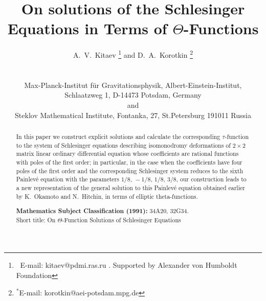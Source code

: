 \documentclass[11pt]{article}
\begin{document}
\title{On solutions of the Schlesinger Equations 
in Terms of $\Theta$-Functions}
\author{A.~V.~Kitaev 
\thanks{$\;\;$E-mail: kitaev@pdmi.ras.ru .
Supported by Alexander von Humboldt Foundation}\hskip0.5cm and\hskip0.5cm 
D.~A.~Korotkin
\thanks{$^*$E-mail: korotkin@aei-potsdam.mpg.de}
\addtocounter{footnote}{-1}
\\
\\Max-Planck-Institut f\"ur Gravitationsphysik, Albert-Einstein-Institut,\\
Schlaatzweg 1, D-14473 Potsdam, Germany\\
and\\
Steklov Mathematical Institute, Fontanka, 27, St.Petersburg 191011 Russia}

\maketitle
\begin{abstract}
In this paper we construct explicit solutions and calculate the corresponding
$\tau$-function to the system of Schlesinger equations describing isomonodromy deformations of $2\times 2$ matrix linear ordinary differential equation whose
coefficients are rational functions with poles of the first order; in particular, in the case when the coefficients have four poles of the first order and the corresponding Schlesinger system reduces to the sixth Painlev\'e equation with the parameters $1
/8,\,-1/8,\,1/8,\,3/8$, our construction leads to a new representation of the general solution to this Painlev\'e equation obtained earlier by K.~Okamoto and N.~Hitchin, in terms of elliptic theta-functions.\vspace{24pt}


{\bf Mathematics Subject Classification (1991):}
34A20, 32G34.\vspace{24pt}\\
Short title: On $\Theta$-Function Solutions of Schlesinger Equations 
\end{abstract}

\newpage
\end{document}
